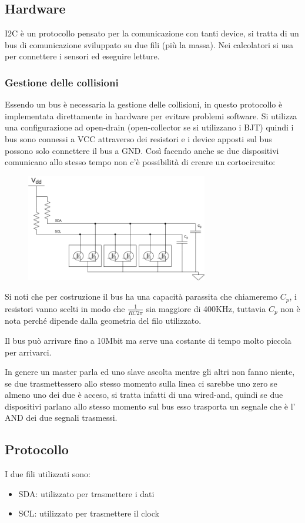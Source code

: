 \subsection{Hardware}
I2C è un protocollo pensato per la comunicazione con tanti device, si tratta di un bus di comunicazione sviluppato su due fili (più la massa).
Nei calcolatori si usa per connettere i sensori ed eseguire letture.

\subsubsection{Gestione delle collisioni}
Essendo un bus è necessaria la gestione delle collisioni, in questo protocollo è implementata direttamente in hardware per evitare problemi software.
Si utilizza una configurazione ad open-drain (open-collector se si utilizzano i BJT) quindi i bus sono connessi a VCC attraverso dei resistori e i device apposti sul bus possono solo connettere il bus a GND.
Così facendo anche se due dispositivi comunicano allo stesso tempo non c'è possibilità di creare un cortocircuito:
\begin{figure}[H]
    \centering
    \includegraphics[width=300px]{images/24_I2C-TWI/i2c_bus.png}
\end{figure}
Si noti che per costruzione il bus ha una capacità parassita che chiameremo $C_p$, i resistori vanno scelti in modo che $\frac{1}{RC2\pi}$ sia maggiore di 400KHz, tuttavia $C_p$ non è nota perché dipende dalla geometria del filo utilizzato.

Il bus può arrivare fino a 10Mbit ma serve una costante di tempo molto piccola per arrivarci.

In genere un master parla ed uno slave ascolta mentre gli altri non fanno niente, se due trasmettessero allo stesso momento sulla linea ci sarebbe uno zero se almeno uno dei due è acceso, si tratta infatti di una wired-and, quindi se due dispositivi parlano allo stesso momento sul bus esso trasporta un segnale che è l' AND dei due segnali trasmessi.

\subsection{Protocollo}
I due fili utilizzati sono:
\begin{itemize}
    \item SDA: utilizzato per trasmettere i dati
    \item SCL: utilizzato per trasmettere il clock
\end{itemize}

